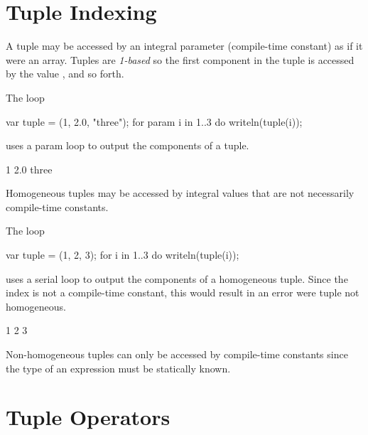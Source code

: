 \section{Tuple Indexing}
\label{Tuple_Indexing}

A tuple may be accessed by an integral parameter (compile-time
constant) as if it were an array.  Tuples are \emph{1-based} so the
first component in the tuple is accessed by the value , and so
forth.

\begin{example}
\begin{chapelpre}
\end{chapelpre}
The loop
\begin{chapel}
var tuple = (1, 2.0, "three");
for param i in 1..3 do
  writeln(tuple(i));
\end{chapel}
uses a param loop to output the components of a tuple.
\begin{chapelpost}
\end{chapelpost}
\begin{chapeloutput}
1
2.0
three
\end{chapeloutput}
\end{example}

Homogeneous tuples may be accessed by integral values that are not
necessarily compile-time constants.

\begin{example}
\begin{chapelpre}
\end{chapelpre}
The loop
\begin{chapel}
var tuple = (1, 2, 3);
for i in 1..3 do
  writeln(tuple(i));
\end{chapel}
uses a serial loop to output the components of a homogeneous tuple.
Since the index is not a compile-time constant, this would result in
an error were tuple not homogeneous.
\begin{chapelpost}
\end{chapelpost}
\begin{chapeloutput}
1
2
3
\end{chapeloutput}
\end{example}

\begin{rationale}
Non-homogeneous tuples can only be accessed by compile-time constants
since the type of an expression must be statically known.
\end{rationale}

\section{Tuple Operators}
\label{Tuple_Operators}

